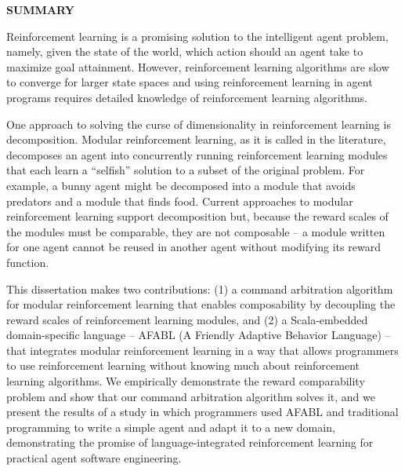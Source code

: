 \clearpage
\begin{centering}
\textbf{SUMMARY}\\
\vspace{\baselineskip}
\end{centering}

Reinforcement learning is a promising solution to the intelligent agent problem, namely, given the state of the world, which action should an agent take to maximize goal attainment. However, reinforcement learning algorithms are slow to converge for larger state spaces and using reinforcement learning in agent programs requires detailed knowledge of reinforcement learning algorithms.

One approach to solving the curse of dimensionality in reinforcement learning is decomposition. Modular reinforcement learning, as it is called in the literature, decomposes an agent into concurrently running reinforcement learning modules that each learn a ``selfish'' solution to a subset of the original problem. For example, a bunny agent might be decomposed into a module that avoids predators and a module that finds food. Current approaches to modular reinforcement learning support decomposition but, because the reward scales of the modules must be comparable, they are not composable -- a module written for one agent cannot be reused in another agent without modifying its reward function.

This dissertation makes two contributions: (1) a command arbitration algorithm for modular reinforcement learning that enables composability by decoupling the reward scales of reinforcement learning modules, and (2) a Scala-embedded domain-specific language -- AFABL (A Friendly Adaptive Behavior Language) -- that integrates modular reinforcement learning in a way that allows programmers to use reinforcement learning without knowing much about reinforcement learning algorithms. We empirically demonstrate the reward comparability problem and show that our command arbitration algorithm solves it, and we present the results of a study in which programmers used AFABL and traditional programming to write a simple agent and adapt it to a new domain, demonstrating the promise of language-integrated reinforcement learning for practical agent software engineering.



